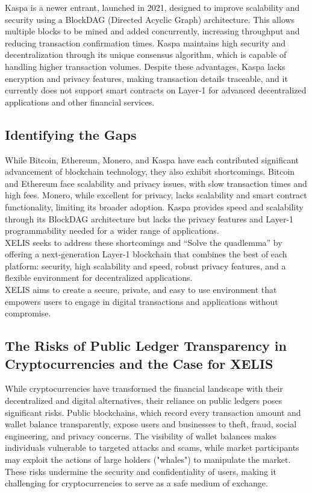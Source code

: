 \documentclass[10pt,a4paper,twocolumn]{article}
\begin{document}
Kaspa is a newer entrant, launched in 2021, designed to improve scalability and security using a BlockDAG (Directed Acyclic Graph) architecture. This allows multiple blocks to be mined and added concurrently, increasing throughput and reducing transaction confirmation times. Kaspa maintains high security and decentralization through its unique consensus algorithm, which is capable of handling higher transaction volumes. Despite these advantages, Kaspa lacks encryption and privacy features, making transaction details traceable, and it currently does not support smart contracts on Layer-1 for advanced decentralized applications and other financial services.\\


\subsection{Identifying the Gaps}

While Bitcoin, Ethereum, Monero, and Kaspa have each contributed significant advancement of blockchain technology, they also exhibit shortcomings. Bitcoin and Ethereum face scalability and privacy issues, with slow transaction times and high fees. Monero, while excellent for privacy, lacks scalability and smart contract functionality, limiting its broader adoption. Kaspa provides speed and scalability through its BlockDAG architecture but lacks the privacy features and Layer-1 programmability needed for a wider range of applications.\\

XELIS seeks to address these shortcomings and “Solve the quadlemma” by offering a next-generation Layer-1 blockchain that combines the best of each platform: security, high scalability and speed, robust privacy features, and a flexible environment for decentralized applications.\\

XELIS aims to create a secure, private, and easy to use environment that empowers users to engage in digital transactions and applications without compromise.\\


\subsection{The Risks of Public Ledger Transparency in Cryptocurrencies and the Case for XELIS}

While cryptocurrencies have transformed the financial landscape with their decentralized and digital alternatives, their reliance on public ledgers poses significant risks. Public blockchains, which record every transaction amount and wallet balance transparently, expose users and businesses to theft, fraud, social engineering, and privacy concerns. The visibility of wallet balances makes individuals vulnerable to targeted attacks and scams, while market participants may exploit the actions of large holders ("whales") to manipulate the market. These risks undermine the security and confidentiality of users, making it challenging for cryptocurrencies to serve as a safe medium of exchange.\\
\end{document}
